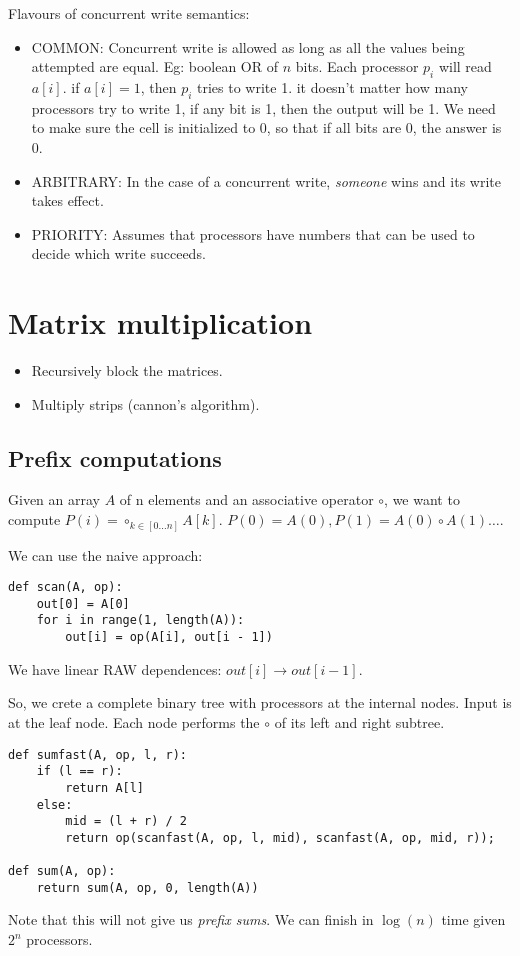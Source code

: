 Flavours of concurrent write semantics:
\begin{itemize}
    \item COMMON: Concurrent write is allowed as long as all the values being
        attempted are equal. Eg: boolean OR of $n$ bits. Each processor $p_i$
        will read $a[i]$. if $a[i] = 1$, then $p_i$ tries to write 1.
        it doesn't matter how many processors try to write 1, if any bit is
        1, then the output will be 1. We need to make sure the cell is
        initialized to 0, so that if all bits are 0, the answer is 0.
    \item ARBITRARY: In the case of a concurrent write, \textit{someone} wins
        and its write takes effect.
    \item PRIORITY: Assumes that processors have numbers that can be used
        to decide which write succeeds.
\end{itemize}

\section{Matrix multiplication}

\begin{itemize}
    \item Recursively block the matrices.
    \item Multiply strips (cannon's algorithm).
\end{itemize}

\subsection{Prefix computations}
Given an array $A$ of n elements and an associative operator $\circ$, we want
to compute $P(i) = \circ_{k \in [0\dots n]} A[k]$.
$P(0) = A(0), P(1) = A(0) \circ A(1) \dots$.


We can use the naive approach:
\begin{verbatim}
def scan(A, op):
    out[0] = A[0]
    for i in range(1, length(A)):
        out[i] = op(A[i], out[i - 1])
\end{verbatim}

We have  linear RAW dependences:  $out[i] \to out[i - 1]$.

So, we crete a complete binary tree with processors at the internal nodes.
Input is at the leaf node. Each node performs the $\circ$ of its left and
right subtree.


\begin{verbatim}
def sumfast(A, op, l, r):
    if (l == r):
        return A[l]
    else:
        mid = (l + r) / 2
        return op(scanfast(A, op, l, mid), scanfast(A, op, mid, r));

def sum(A, op):
    return sum(A, op, 0, length(A))
\end{verbatim}
Note that this will not give us \textit{prefix sums}.
We can finish in $\log(n)$ time given $2^n$ processors.

